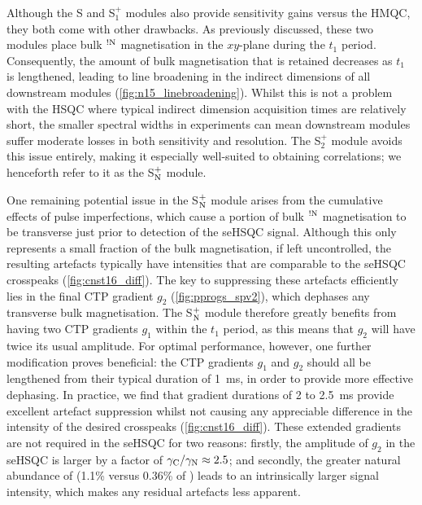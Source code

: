 \documentclass[11pt]{article}
\newcommand*{\noahS}{S}
\newcommand*{\noahSpa}{S$^+_1$}
\newcommand*{\noahSpb}{S$^+_2$}
\newcommand*{\noahSpn}{S$\rm ^+_N$}
\newcommand*{\carbon}{\ce{^{13}C}}
\newcommand*{\nitrogen}{\ce{^{15}N}}
\newcommand*{\magnnot}[1]{\ce{^1H}$^{!#1}$}
\begin{document}
Although the \noahS{} and \noahSpa{} modules also provide sensitivity gains versus the HMQC, they both come with other drawbacks.
As previously discussed, these two modules place bulk \magnnot{\ce{N}} magnetisation in the $xy$-plane during the $t_1$ period.
Consequently, the amount of bulk magnetisation that is retained decreases as $t_1$ is lengthened, leading to line broadening in the indirect dimensions of all downstream modules (\cref{fig:n15_linebroadening}).
Whilst this is not a problem with the \carbon{} HSQC where typical \carbon{} indirect dimension acquisition times are relatively short, the smaller spectral widths in \nitrogen{} experiments can mean downstream modules suffer moderate losses in both sensitivity and resolution.
The \noahSpb{} module avoids this issue entirely, making it especially well-suited to obtaining \nitrogen{} correlations; we henceforth refer to it as the \noahSpn{} module.

One remaining potential issue in the \noahSpn{} module arises from the cumulative effects of pulse imperfections, which cause a portion of bulk \magnnot{\ce{N}} magnetisation to be transverse just prior to detection of the seHSQC signal.
Although this only represents a small fraction of the bulk magnetisation, if left uncontrolled, the resulting artefacts typically have intensities that are comparable to the seHSQC crosspeaks (\cref{fig:cnst16_diff}).
The key to suppressing these artefacts efficiently lies in the final CTP gradient $g_2$ (\cref{fig:pprogs_spv2}), which dephases any transverse bulk magnetisation.
The \noahSpn{} module therefore greatly benefits from having two CTP gradients $g_1$ within the $t_1$ period, as this means that $g_2$ will have twice its usual amplitude.
For optimal performance, however, one further modification proves beneficial: the CTP gradients $g_1$ and $g_2$ should all be lengthened from their typical duration of \SI{1}{\ms}, in order to provide more effective dephasing.
In practice, we find that gradient durations of 2 to \SI{2.5}{\ms} provide excellent artefact suppression whilst not causing any appreciable difference in the intensity of the desired crosspeaks (\cref{fig:cnst16_diff}).
These extended gradients are not required in the \carbon{} seHSQC for two reasons: firstly, the amplitude of $g_2$ in the \carbon{} seHSQC is larger by a factor of $\gamma_{\ce{C}}/\gamma_{\ce{N}} \approx 2.5$; and secondly, the greater natural abundance of \carbon{} (1.1\% versus 0.36\% of \nitrogen{}) leads to an intrinsically larger signal intensity, which makes any residual artefacts less apparent.
\end{document}
